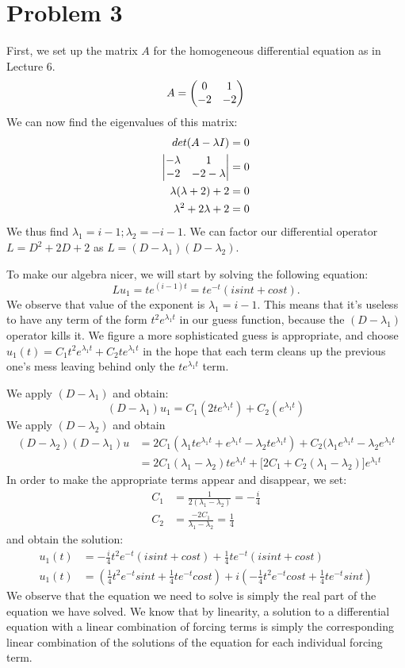 \documentclass[11pt]{article}
\begin{document}
\section*{Problem 3}
First, we set up the matrix $A$ for the homogeneous differential equation as in Lecture 6.
\[
A = \mqty(0 & 1 \\ -2 & -2)
\]
We can now find the eigenvalues of this matrix:
\begin{align*}
det(A-\lambda I) &= 0 \\
\mdet{-\lambda & 1 \\ -2 & -2-\lambda} &= 0 \\
\lambda(\lambda + 2) + 2 &= 0 \\
\lambda^2 + 2\lambda +2 &= 0
\end{align*}
We thus find $\lambda_1 = i - 1; \lambda_2 = -i - 1$. We can factor our differential operator $L=D^2 + 2D + 2$ as $L = (D-\lambda_1)(D-\lambda_2)$.

To make our algebra nicer, we will start by solving the following equation:
\[
Lu_1 = te^{(i-1)t} = te^{-t} (isin t + cos t).
\]
We observe that value of the exponent is $\lambda_1 = i-1$. This means that it's useless to have any term of the form $t^2 e^{\lambda_1 t}$ in our guess function, because the $(D - \lambda_1)$ operator kills it. We figure a more sophisticated guess is appropriate, and choose $u_1(t) = C_1 t^2 e^{\lambda_1 t} + C_2 t e^{\lambda_1 t}$ in the hope that each term cleans up the previous one's mess leaving behind only the $t e^{\lambda_1 t}$ term.

We apply $(D - \lambda_1)$ and obtain:
\[
(D-\lambda_1)u_1 = C_1 (2t e^{\lambda_1 t}) + C_2 (e^{\lambda_1 t})
\]
We apply $(D - \lambda_2)$ and obtain
\begin{align*}
(D - \lambda_2)(D - \lambda_1)u &= 2C_1(\lambda_1 te^{\lambda_1 t} + e^{\lambda_1 t} - \lambda_2 te^{\lambda_1 t}) + C_2(\lambda_1 e^{\lambda_1 t} - \lambda_2 e^{\lambda_1 t} \\
&= 2C_1(\lambda_1 - \lambda_2)te^{\lambda_1 t} + \big[2C_1 + C_2 (\lambda_1 - \lambda_2) \big] e^{\lambda_1 t}
\end{align*}
In order to make the appropriate terms appear and disappear, we set:
\begin{align*}
C_1 &= \frac{1}{2(\lambda_1 - \lambda_2)}  = -\frac{i}{4} \\
C_2 &= \frac{-2C_1}{\lambda_1 - \lambda_2} = \frac{1}{4}
\end{align*}
and obtain the solution:
\begin{align*}
u_1(t) &= -\frac{i}{4} t^2 e^{-t} (i sin t + cos t) + \frac{1}{4} te^{-t} (i sin t + cos t) \\
u_1(t) &= (\frac{1}{4} t^2 e^{-t} sin t + \frac{1}{4} te^{-t} cos t) + i(-\frac{1}{4} t^2 e^{-t} cos t + \frac{1}{4} te^{-t} sin t)
\end{align*}
We observe that the equation we need to solve is simply the real part of the equation we have solved. We know that by linearity, a solution to a differential equation with a linear combination of forcing terms is simply the corresponding linear combination of the solutions of the equation for each individual forcing term.
\end{document}
